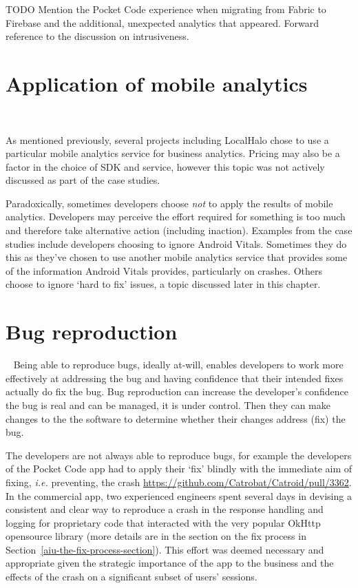 TODO Mention the Pocket Code experience when migrating from Fabric to Firebase and the additional, unexpected analytics that appeared. Forward reference to the discussion on intrusiveness. 


\section{Application of mobile analytics}~\label{aiu-application-of-mobile-analytics-section}

As mentioned previously, several projects including LocalHalo chose to use a particular mobile analytics service for business analytics. Pricing may also be a factor in the choice of SDK and service, however this topic was not actively discussed as part of the case studies.

Paradoxically, sometimes developers choose \emph{not} to apply the results of mobile analytics. Developers may perceive the effort required for something is too much and therefore take alternative action (including inaction). Examples from the case studies include developers choosing to ignore Android Vitals. Sometimes they do this as they've chosen to use another mobile analytics service that provides some of the information Android Vitals provides, particularly on crashes. Others choose to ignore `hard to fix' issues, a topic discussed later in this chapter.


\section{Bug reproduction}~\label{aiu-bug-reproduction}
Being able to reproduce bugs, ideally at-will, enables developers to work more effectively at addressing the bug and having confidence that their intended fixes actually do fix the bug. 
Bug reproduction can increase the developer's confidence the bug is real and can be managed, it is under control. Then they can make changes to the the software to determine whether their changes address (fix) the bug. 

The developers are not always able to reproduce bugs, for example the developers of the Pocket Code app had to apply their `fix' blindly with the immediate aim of fixing, \emph{i.e.} preventing, the crash \url{https://github.com/Catrobat/Catroid/pull/3362}.  In the commercial app, two experienced engineers spent several days in devising a consistent and clear way to reproduce a crash in the response handling and logging for proprietary code that interacted with the very popular OkHttp opensource library (more details are in the section on the fix process in Section~\ref{aiu-the-fix-process-section}). This effort was deemed necessary and appropriate given the strategic importance of the app to the business and the effects of the crash on a significant subset of users' sessions.

